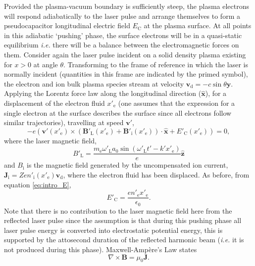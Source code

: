 Provided the plasma-vacuum boundary is sufficiently steep, the plasma electrons will respond adiabatically to the laser pulse and arrange themselves to form a pseudocapacitor longitudinal electric field $E_\mathrm{C}$ at the plasma surface. At all points in this adiabatic `pushing' phase, the surface electrons will be in a quasi-static equilibrium \textit{i.e.} there will be a balance between the electromagnetic forces on them. Consider again the laser pulse incident on a solid density plasma existing for $x>0$ at angle $\theta$. Transforming to the frame of reference in which the laser is normally incident (quantities in this frame are indicated by the primed symbol), the electron and ion bulk plasma species stream at velocity $\mathbf{v}_\mathrm{d} = -c \sin\theta \hat{\mathbf{y}}$.  Applying the Lorentz force law along the longitudinal direction ($\hat{\mathbf{x}}$), for a displacement of the electron fluid $x'_\mathrm{e}$ (one assumes that the expression for a single electron at the surface describes the surface since all electrons follow similar trajectories), travelling at speed $\mathbf{v'}$,
\begin{equation}\label{eq:zvp_eq}
	-e(\mathbf{v'}(x'_\mathrm{e})\times (\mathbf{B}'_\mathrm{L}(x'_\mathrm{e}) + \mathbf{B}'_\mathrm{i}(x'_\mathrm{e}))\cdot \hat{\mathbf{x}} + E'_\mathrm{C}(x'_\mathrm{e}) )= 0,
\end{equation}
where the laser magnetic field,
\begin{equation}\label{eq:zvp_Bl}
	B'_\mathrm{L} = \frac{m_\mathrm{e} \omega'_\mathrm{L}a_0\sin(\omega'_\mathrm{L}t'-k'x'_\mathrm{e})}{e} \hat{\mathbf{z}}
\end{equation}
and $B_\mathrm{i}$ is the magnetic field generated by the uncompensated ion current, $\mathbf{J_\mathrm{i}} =  Zen'_\mathrm{i}(x'_\mathrm{e}) \mathbf{v}_\mathrm{d}$, where the electron fluid has been displaced. As before, from equation \ref{eq:intro_E},
\begin{equation}\label{eq:zvp_Ec}
	E'_\mathrm{C} = \frac{en'_\mathrm{e}x'_\mathrm{e}}{\epsilon_0}.
\end{equation}
Note that there is no contribution to the laser magnetic field here from the reflected laser pulse since the assumption is that during this pushing phase all laser pulse energy is converted into electrostatic potential energy, this is supported by the attosecond duration of the reflected harmonic beam (\textit{i.e.} it is not produced during this phase). Maxwell-Ampère's Law states
\begin{equation}\label{eq:zvp_maxwellampere}
	\nabla \times \mathbf{B} = \mu_0 \mathbf{J}.
\end{equation}
